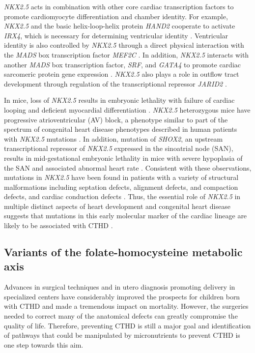 \begin{refsection}
\textit{NKX2.5} acts in combination with other core cardiac transcription factors to promote cardiomyocyte differentiation and chamber identity. For example, \textit{NKX2.5} and the basic helix-loop-helix protein \textit{HAND2} cooperate to activate \textit{IRX4}, which is necessary for determining ventricular identity \cite{yamagishi2001combinatorial}. Ventricular identity is also controlled by \textit{NKX2.5} through a direct physical interaction with the \textit{MADS} box transcription factor \textit{MEF2C} \cite{vincentz2008cooperative}. In addition, \textit{NKX2.5} interacts with another \textit{MADS} box transcription factor, \textit{SRF}, and \textit{GATA4} to promote cardiac sarcomeric protein gene expression \cite{sepulveda2002combinatorial}. \textit{NKX2.5} also plays a role in outflow tract development through regulation of the transcriptional repressor \textit{JARID2} \cite{barth2010jarid2}.

In mice, loss of \textit{NKX2.5} results in embryonic lethality with failure of cardiac looping and deficient myocardial differentiation \cite{lyons1995myogenic,tanaka1999cardiac}. \textit{NKX2.5} heterozygous mice have progressive atrioventricular (AV) block, a phenotype similar to part of the spectrum of congenital heart disease phenotypes described in human patients with \textit{NKX2.5} mutations \cite{benson2010genetic,biben2000cardiac}. In addition, mutation of \textit{SHOX2}, an upstream transcriptional repressor of \textit{NKX2.5} expressed in the sinoatrial node (SAN), results in mid-gestational embryonic lethality in mice with severe hypoplasia of the SAN and associated abnormal heart rate \cite{blaschke2007targeted,espinoza2009shox2}. Consistent with these observations, mutations in \textit{NKX2.5} have been found in patients with a variety of structural malformations including septation defects, alignment defects, and compaction defects, and cardiac conduction defects \cite{reamon2010nkx2,jay2004nkx2}. Thus, the essential role of \textit{NKX2.5} in multiple distinct aspects of heart development and congenital heart disease suggests that mutations in this early molecular marker of the cardiac lineage are likely to be associated with CTHD \cite{moskowitz2007molecular}.

\subsection{Variants of the folate-homocysteine metabolic axis}

Advances in surgical techniques and in utero diagnosis promoting delivery in specialized centers have considerably improved the prospects for children born with CTHD and made a tremendous impact on mortality. However, the surgeries needed to correct many of the anatomical defects can greatly compromise the quality of life. Therefore, preventing CTHD is still a major goal and identification of pathways that could be manipulated by micronutrients to prevent CTHD is one step towards this aim.


\end{refsection}
